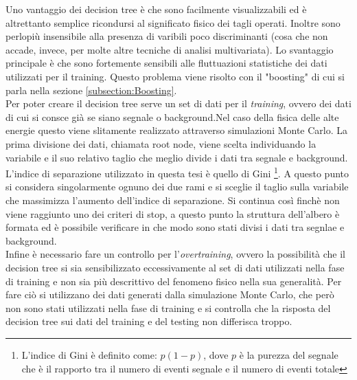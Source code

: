     Uno vantaggio dei decision tree è che sono facilmente visualizzabili ed è altrettanto semplice ricondursi al significato fisico dei tagli operati. Inoltre sono perlopiù insensibile alla presenza di varibili poco discriminanti (cosa che non accade, invece, per molte altre tecniche di analisi multivariata). Lo svantaggio principale è che sono fortemente sensibili alle fluttuazioni statistiche dei dati utilizzati per il training. Questo problema viene risolto con il "boosting" di cui si parla nella sezione \ref{subsection:Boosting}.
    \\Per poter creare il decision tree serve un set di dati per il \textit{training}, ovvero dei dati di cui si consce già se siano segnale o background.Nel caso della fisica delle alte energie questo viene slitamente realizzato attraverso simulazioni Monte Carlo. La prima divisione dei dati, chiamata root node, viene scelta individuando la variabile e il suo relativo taglio che meglio divide i dati tra segnale e background. L'indice di separazione utilizzato in questa tesi è quello di Gini \footnote{L'indice di Gini è definito come: $p (1-p)$, dove $p$ è la purezza del segnale che è il rapporto tra il numero di eventi segnale e il numero di eventi totale}. A questo punto si considera singolarmente ognuno dei due rami e si sceglie il taglio sulla variabile che massimizza l'aumento dell'indice di separazione. Si continua così finchè non viene raggiunto uno dei criteri di stop,  a questo punto la struttura dell'albero è formata ed è possibile verificare in che modo sono stati divisi i dati tra segnlae e background. 
    \\Infine è necessario fare un controllo per l'\textit{overtraining}, ovvero la possibilità che il decision tree si sia sensibilizzato eccessivamente al set di dati utilizzati nella fase di training e non sia più descrittivo del fenomeno fisico nella sua generalità. Per fare ciò si utilizzano dei dati generati dalla simulazione Monte Carlo, che però non sono stati utilizzati nella fase di training e si controlla che la risposta del decision tree sui dati del training e del testing non differisca troppo.\cite{TMVAGuide} 
 
